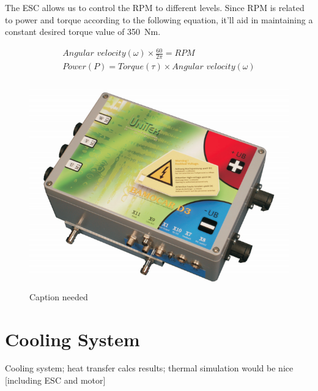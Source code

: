 \documentclass[main.tex]{subfiles}
\begin{document}
	The ESC allows us to control the RPM to different levels. Since RPM is related to power and torque according to the following equation, it'll aid in maintaining a constant desired torque value of \SI{350}{Nm}.

     \begin{gather*}
     	\textit{Angular velocity} (\omega) \times \frac{60}{2\pi} = \textit{RPM}\\
     	\textit{Power} (P) = \textit{Torque} (\tau)  \times \textit{Angular velocity} (\omega)\\
     \end{gather*}
   
    \begin{figure}[H]
        \centering
        \includegraphics[width=\linewidth]{images/fig17}
        \caption{Caption needed}
    \end{figure}

    \section{Cooling System}
    Cooling system; heat transfer calcs results; thermal simulation would be nice [including ESC and motor]\\
\end{document}
